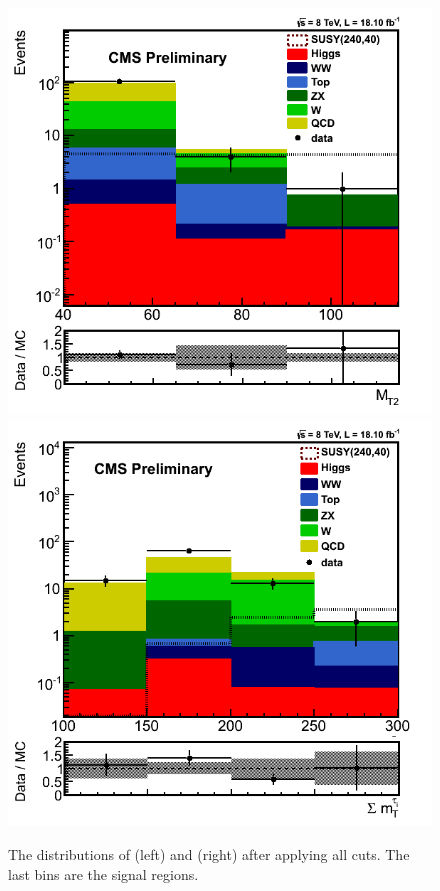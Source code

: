\begin{figure}[!Hhtb]
\centering
\includegraphics[angle=0,scale=0.375]{TauTauFigs/MT2_SSQCD.png}
\includegraphics[angle=0,scale=0.375]{TauTauFigs/SumMT_SSQCD.png} \\
\caption{The distributions of \mttwo (left) and \SumMT (right) after applying all cuts. The last bins are the signal regions.}
\label{fig:comparison}
\end{figure}
